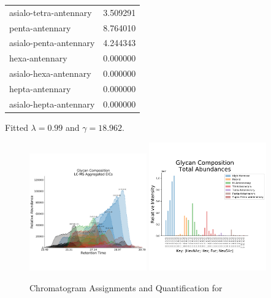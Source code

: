 \begin{table}[!htb]
\begin{threeparttable}
\begin{tabular}{l l}
                asialo-tetra-antennary & 3.509291 \\
                penta-antennary & 8.764010 \\
                asialo-penta-antennary & 4.244343 \\
                hexa-antennary & 0.000000 \\
                asialo-hexa-antennary & 0.000000 \\
                hepta-antennary & 0.000000 \\
                asialo-hepta-antennary & 0.000000 \\
                \bottomrule
            \end{tabular}
            \begin{tablenotes}[normal]
                \item Fitted $\lambda = 0.99$ and $\gamma = 18.962$.
            \end{tablenotes}
        \end{threeparttable}
    \end{table}

    \begin{figure}[!htb]
        \caption{Chromatogram Assignments and Quantification
                 for \philbs\label{fig:philbs_assignments}}
        \centering
        \includegraphics[width=0.45\textwidth,valign=t]{figure/phil_bs_chromatograms.pdf}
        \includegraphics[width=0.45\textwidth,valign=t]{figure/phil_bs_abundances.pdf}
    \end{figure}

